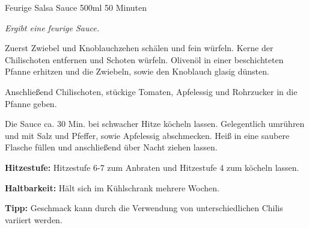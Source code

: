\begin{recipe}{Feurige Salsa Sauce} {500ml} {50 Minuten}

\freeform
\textit{Ergibt eine feurige Sauce.}


Zuerst Zwiebel und Knoblauchzehen schälen und fein würfeln.
Kerne der Chilischoten entfernen und Schoten würfeln.
Olivenöl in einer beschichteten Pfanne erhitzen und die Zwiebeln, sowie den Knoblauch glasig dünsten.


Anschließend Chilischoten, stückige Tomaten, Apfelessig und Rohrzucker in die Pfanne geben.


Die Sauce ca. 30 Min. bei schwacher Hitze köcheln lassen.
Gelegentlich umrühren und mit Salz und Pfeffer, sowie Apfelessig abschmecken.
Heiß in eine saubere Flasche füllen und anschließend über Nacht ziehen lassen.

\freeform
\hrulefill

\freeform
\textbf{Hitzestufe:}
Hitzestufe 6-7 zum Anbraten und Hitzestufe 4 zum köcheln lassen.

\freeform 
\textbf{Haltbarkeit:}
Hält sich im Kühlschrank mehrere Wochen.

\freeform 
\textbf{Tipp:}
Geschmack kann durch die Verwendung von unterschiedlichen Chilis variiert werden.

\end{recipe}
